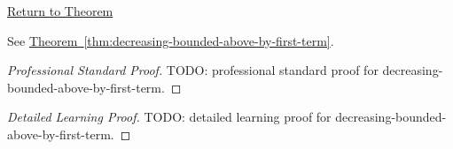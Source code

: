 \newpage
{}
\label{prf:decreasing-bounded-above-by-first-term}

\begin{remark*}[Return]
\hyperref[thm:decreasing-bounded-above-by-first-term]{Return to Theorem}
\end{remark*}

\begin{theorem*}
See \hyperref[thm:decreasing-bounded-above-by-first-term]{Theorem~\ref*{thm:decreasing-bounded-above-by-first-term}}.
\end{theorem*}

\begin{proof}[Professional Standard Proof]
\LRAProofBodyStart
TODO: professional standard proof for decreasing-bounded-above-by-first-term.
\end{proof}

\begin{proof}[Detailed Learning Proof]
\LRAProofBodyStart
TODO: detailed learning proof for decreasing-bounded-above-by-first-term.
\end{proof}

\begin{remark*}
\end{remark*}

\begin{dependencies}
\NoLocalDependencies
\end{dependencies}

\clearpage
